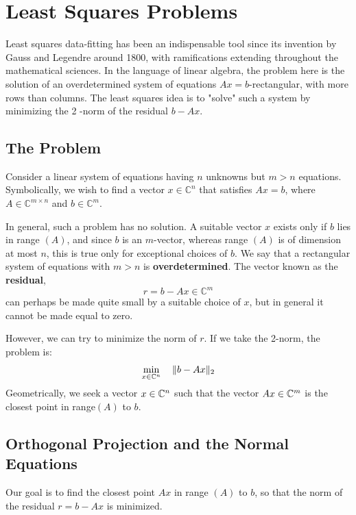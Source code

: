 \chapter{Least Squares Problems} 

Least squares data-fitting has been an indispensable tool since its invention by Gauss and Legendre around 1800, with ramifications extending throughout the mathematical sciences. In the language of linear algebra, the problem here is the solution of an overdetermined system of equations $A x=b$-rectangular, with more rows than columns. The least squares idea is to "solve" such a system by minimizing the 2 -norm of the residual $b-A x$. 

\section{The Problem}
Consider a linear system of equations having $n$ unknowns but $m>n$ equations. Symbolically, we wish to find a vector $x \in \mathbb{C}^n$ that satisfies $A x=b$, where $A \in \mathbb{C}^{m \times n}$ and $b \in \mathbb{C}^m$. 

In general, such a problem has no solution. A suitable vector $x$ exists only if $b$ lies in range $(A)$, and since $b$ is an $m$-vector, whereas range $(A)$ is of dimension at most $n$, this is true only for exceptional choices of $b$. We say that a rectangular system of equations with $m>n$ is \textbf{overdetermined}. The vector known as the \textbf{residual},
$$
r=b-A x \in \mathbb{C}^m
$$
can perhaps be made quite small by a suitable choice of $x$, but in general it cannot be made equal to zero. 

However, we can try to minimize the norm of $r$. If we take the 2-norm, the problem is: 
\begin{equation}
    \label{eq: least sq}
        \min_{x\in \mathbb{C}^n} \quad \|b-Ax\|_2
\end{equation}
Geometrically, we seek a vector $x\in \mathbb{C}^n$ such that the vector $Ax\in \mathbb{C}^m$ is the closest point in range$(A)$ to $b$. 

\section{Orthogonal Projection and the Normal Equations} 
Our goal is to find the closest point $A x$ in range $(A)$ to $b$, so that the norm of the residual $r=b-A x$ is minimized. 

